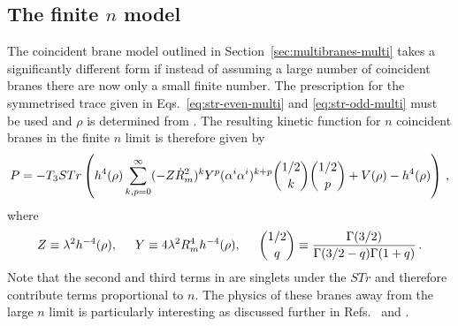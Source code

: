 \subsection{\texorpdfstring{The finite $n$ model}{The finite n model}}
\label{sec:finitensub-multi}
The coincident brane model outlined in Section~\ref{sec:multibranes-multi}
takes a significantly different form if instead of assuming a large number of
coincident branes there are now only a small finite number. The prescription for
the symmetrised trace given in Eqs.~\eqref{eq:str-even-multi} and
\eqref{eq:str-odd-multi} must be used and $\rho$ is determined from
. 
% 
The resulting kinetic function for $n$ coincident branes in 
the finite $n$ limit is therefore given by
% 
\begin{equation}
\label{eq:genP-multi}
P = -T_3 STr \left(h^4(\rho) \sum_{k,p=0}^{\infty}(-Z\dot{R}_m^2)^k Y^p (\alpha^i
\alpha^i)^{k+p}\binom{1/2}{k} \binom{1/2}{p} + V(\rho)-h^4(\rho) \right) \,,
\end{equation}
% 
where 
% 
\begin{equation}
Z \equiv \lambda^2 h^{-4}(\rho), \hspace{0.5cm} Y \equiv 4\lambda^2 R_m^4
h^{-4}(\rho),
\hspace{0.5cm} \binom{1/2}{q}
\equiv \frac{\Gamma(3/2)}{\Gamma(3/2-q)\Gamma(1+q)} \,.
\end{equation}
% 
Note that the second and third terms in  
are singlets under the $STr$ and therefore contribute terms proportional 
to $n$. The physics of these branes away from the large $n$ limit is particularly interesting as
discussed further
in Refs.~\cite{thomasward} and \cite{Ward:2007gs}.


